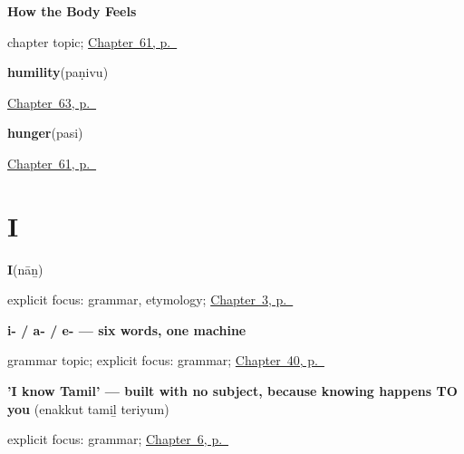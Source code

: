 \noindent\begin{minipage}[t]{\linewidth}
\raggedright
\textbf{How the Body Feels}\par
\footnotesize chapter topic; \hyperref[ch:ta-how-the-body-feels]{Chapter~61, p.~\pageref*{ch:ta-how-the-body-feels}}
\end{minipage}\par\smallskip

\noindent\begin{minipage}[t]{\linewidth}
\raggedright
\textbf{humility}\enspace\emph{}\enspace(paṇivu)\par
\footnotesize \hyperref[ch:ta-asking-well]{Chapter~63, p.~\pageref*{ch:ta-asking-well}}
\end{minipage}\par\smallskip

\noindent\begin{minipage}[t]{\linewidth}
\raggedright
\textbf{hunger}\enspace\emph{}\enspace(pasi)\par
\footnotesize \hyperref[ch:ta-how-the-body-feels]{Chapter~61, p.~\pageref*{ch:ta-how-the-body-feels}}
\end{minipage}\par\smallskip

\section*{I}

\noindent\begin{minipage}[t]{\linewidth}
\raggedright
\textbf{I}\enspace\emph{}\enspace(nāṉ)\par
\footnotesize explicit focus: grammar, etymology; \hyperref[ch:responding]{Chapter~3, p.~\pageref*{ch:responding}}
\end{minipage}\par\smallskip

\noindent\begin{minipage}[t]{\linewidth}
\raggedright
\textbf{i- / a- / e- — six words, one machine}\par
\footnotesize grammar topic; explicit focus: grammar; \hyperref[ch:ta-pointing-and-asking]{Chapter~40, p.~\pageref*{ch:ta-pointing-and-asking}}
\end{minipage}\par\smallskip

\noindent\begin{minipage}[t]{\linewidth}
\raggedright
\textbf{'I know Tamil' — built with no subject, because knowing happens TO you}\enspace\emph{  }\enspace(enakkut tamiḻ teriyum)\par
\footnotesize explicit focus: grammar; \hyperref[ch:ta-dative-case]{Chapter~6, p.~\pageref*{ch:ta-dative-case}}
\end{minipage}\par\smallskip

